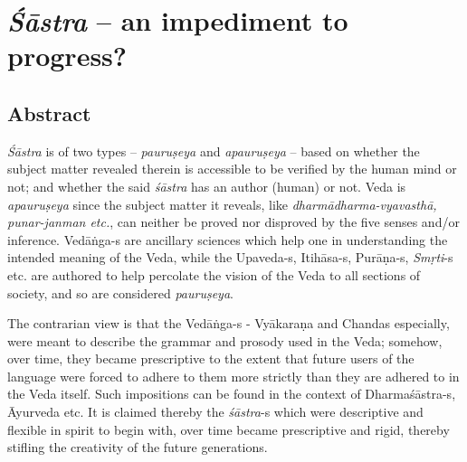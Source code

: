 \chapter{{{\sl\bfseries Śāstra}\relax} -- an impediment to progress?}\label{chapter5}
\vskip -10pt



\vskip -10pt


\section*{Abstract}

{\sl Śāstra} is of two types -- {\sl pauruṣeya} and {\sl apauruṣeya} --   based on whether the subject matter revealed therein is accessible to be veriﬁed by the human mind or not; and whether the said {\sl śāstra} has an author (human) or not. Veda is {\sl apauruṣeya} since the subject matter it reveals, like {\sl dharmādharma-vyavasthā, punar-janman etc.}, can neither be proved nor disproved by the ﬁve senses and/or inference. Vedāṅga-s are ancillary sciences which help one in understanding the intended meaning of the Veda, while the Upaveda-s, Itihāsa-s, Purāṇa-s, {\sl Smṛti}-s etc. are authored to help percolate the vision of the Veda to all sections of society, and so are considered {\sl pauruṣeya}.

The contrarian view is that the Vedāṅga-s - Vyākaraṇa and Chandas especially, were meant to describe the grammar and prosody used in the Veda; somehow, over time, they became prescriptive to the extent that future users of the language were forced to adhere to them more strictly than they are adhered to in the Veda itself. Such impositions can be found in the context of Dharmaśāstra-s, Āyurveda etc. It is claimed thereby the  {\sl śāstra}-s which were descriptive and ﬂexible in spirit to begin with, over time became prescriptive and rigid, thereby stiﬂing the creativity of the future generations.

